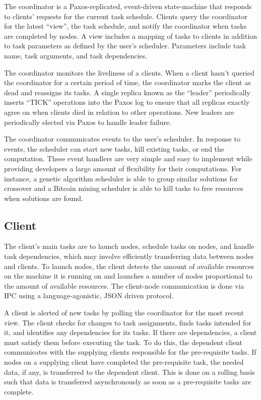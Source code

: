 \documentclass [11pt, twocolumn] {article}
\begin{document}
The coordinator is a Paxos-replicated, event-driven state-machine that responds to clients' requests for the current task schedule. Clients query the coordinator for the latest ``view'', the task schedule, and notify the coordinator when tasks are completed by nodes. A view includes a mapping of tasks to clients in addition to task parameters as defined by the user's scheduler. Parameters include task name, task arguments, and task dependencies. 

The coordinator monitors the liveliness of a clients. When a client hasn't queried the coordinator for a certain period of time, the coordinator marks the client as dead and reassigns its tasks. A single replica known as the ``leader'' periodically inserts ``TICK'' operations into the Paxos log to ensure that all replicas exactly agree on when clients died in relation to other operations. New leaders are periodically elected via Paxos to handle leader failure.

The coordinator communicates events to the user's scheduler. In response to events, the scheduler can start new tasks, kill existing tasks, or end the computation. These event handlers are very simple and easy to implement while providing developers a large amount of flexibility for their computations. For instance, a genetic algorithm scheduler is able to group similar solutions for crossover and a Bitcoin mining scheduler is able to kill tasks to free resources when solutions are found.

\subsection {Client}

The client's main tasks are to launch nodes, schedule tasks on nodes, and handle task dependencies, which may involve efficiently transferring data between nodes and clients. To launch nodes, the client detects the amount of available resources on the machine it is running on and launches a number of nodes proportional to the amount of available resources. The client-node communication is done via IPC using a language-agonistic, JSON driven protocol.

A client is alerted of new tasks by polling the coordinator for the most recent view. The client checks for changes to task assignments, finds tasks intended for it, and identifies any dependencies for its tasks. If there are dependencies, a client must satisfy them before executing the task. To do this, the dependent client communicates with the supplying clients responsible for the pre-requisite tasks. If nodes on a supplying client have completed the pre-requisite task, the needed data, if any, is transferred to the dependent client. This is done on a rolling basis such that data is transferred asynchronously as soon as a pre-requisite tasks are complete.
\end{document}
